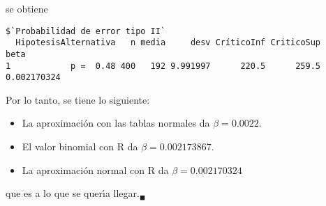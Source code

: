 \begin{solucion}
\begin{enumerate}
  se obtiene
  \begin{verbatim}
$`Probabilidad de error tipo II`
  HipotesisAlternativa   n media     desv CríticoInf CriticoSup        beta
1            p =  0.48 400   192 9.991997      220.5      259.5 0.002170324
  \end{verbatim}
  \vspace{-0.5cm}
  Por lo tanto, se tiene lo siguiente:
  \begin{itemize}
   \item La aproximaci\'on con las tablas normales da $\beta = 0.0022$.
   \item El valor binomial con R da $\beta = 0.002173867$.
   \item La aproximaci\'on normal con R da $\beta = 0.002170324$
  \end{itemize}
  que es a lo que se quer\'{\i}a llegar.${}_{\blacksquare}$
 \end{enumerate}
\end{solucion}

